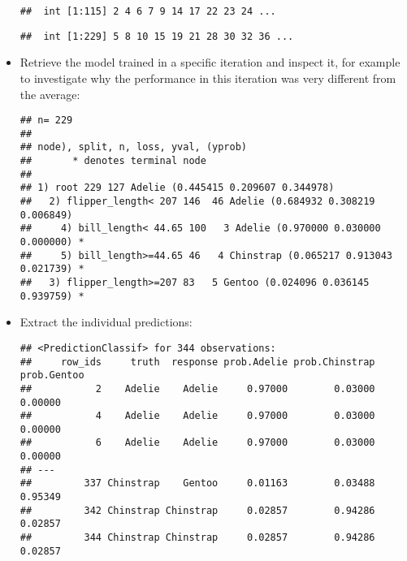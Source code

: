 \documentclass[
]{scrbook}
\newenvironment{Shaded}{\begin{snugshade}}{\end{snugshade}}
\newcommand{\CommentTok}[1]{\textcolor[rgb]{0.56,0.35,0.01}{\textit{#1}}}
\newcommand{\DecValTok}[1]{\textcolor[rgb]{0.00,0.00,0.81}{#1}}
\newcommand{\FunctionTok}[1]{\textcolor[rgb]{0.00,0.00,0.00}{#1}}
\newcommand{\NormalTok}[1]{#1}
\newcommand{\OtherTok}[1]{\textcolor[rgb]{0.56,0.35,0.01}{#1}}
\newcommand{\SpecialCharTok}[1]{\textcolor[rgb]{0.00,0.00,0.00}{#1}}
\renewenvironment{Shaded} {\begin{snugshade}\small} {\end{snugshade}}
\begin{document}
\begin{itemize}
\begin{verbatim}
##  int [1:115] 2 4 6 7 9 14 17 22 23 24 ...
\end{verbatim}

\begin{Shaded}
\end{Shaded}

\begin{verbatim}
##  int [1:229] 5 8 10 15 19 21 28 30 32 36 ...
\end{verbatim}
\item
  Retrieve the model trained in a specific iteration and inspect it, for example to investigate why the performance in this iteration was very different from the average:

\begin{Shaded}
\end{Shaded}

\begin{verbatim}
## n= 229 
## 
## node), split, n, loss, yval, (yprob)
##       * denotes terminal node
## 
## 1) root 229 127 Adelie (0.445415 0.209607 0.344978)  
##   2) flipper_length< 207 146  46 Adelie (0.684932 0.308219 0.006849)  
##     4) bill_length< 44.65 100   3 Adelie (0.970000 0.030000 0.000000) *
##     5) bill_length>=44.65 46   4 Chinstrap (0.065217 0.913043 0.021739) *
##   3) flipper_length>=207 83   5 Gentoo (0.024096 0.036145 0.939759) *
\end{verbatim}
\item
  Extract the individual predictions:

\begin{Shaded}
\end{Shaded}

\begin{verbatim}
## <PredictionClassif> for 344 observations:
##     row_ids     truth  response prob.Adelie prob.Chinstrap prob.Gentoo
##           2    Adelie    Adelie     0.97000        0.03000     0.00000
##           4    Adelie    Adelie     0.97000        0.03000     0.00000
##           6    Adelie    Adelie     0.97000        0.03000     0.00000
## ---                                                                   
##         337 Chinstrap    Gentoo     0.01163        0.03488     0.95349
##         342 Chinstrap Chinstrap     0.02857        0.94286     0.02857
##         344 Chinstrap Chinstrap     0.02857        0.94286     0.02857
\end{verbatim}


\end{itemize}
\end{document}
